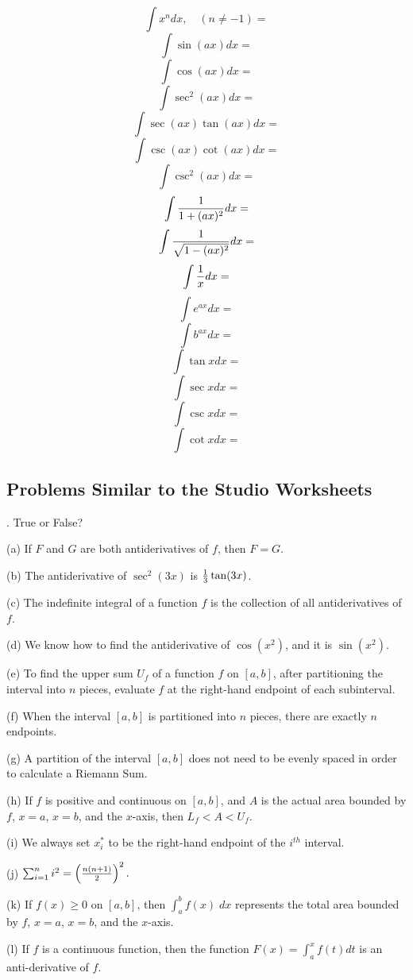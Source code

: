 \documentclass[12pt]{article}
\begin{document}
$$\int x^n dx, \quad (n \neq -1) =$$
$$\int \sin (ax) dx = $$
$$\int \cos (ax) dx = $$
$$\int \sec^2 (ax) dx = $$
$$\int \sec (ax) \tan (ax) dx = $$
$$\int \csc (ax) \cot (ax) dx = $$
$$\int \csc^2 (ax) dx = $$
$$\int {{1}\over{1+(ax)^2}} dx = $$
$$\int {{1}\over{\sqrt{1-(ax)^2}}} dx = $$
$$\int {{1}\over{x}} dx = $$
$$\int e^{ax} dx = $$
$$\int b^{ax} dx = $$
$$\int \tan x dx = $$
$$\int \sec x dx = $$
$$\int \csc x dx = $$
$$\int \cot x dx = $$
\vfil\eject

\subsection*{Problems Similar to the Studio Worksheets}

. True or False?

\noindent (a) If $F$ and $G$ are both antiderivatives of $f$, then $F=G$.

\noindent (b) The antiderivative of $\sec^2 (3x)$ is ${{1}\over{3}} \tan 
(3x)$.

\noindent (c) The indefinite integral of a function $f$ is the collection of 
all antiderivatives of $f$.

\noindent (d) We know how to find the antiderivative of $\cos(x^2)$, and it is 
$\sin (x^2)$.

\noindent (e) To find the upper sum $U_f$ of a function $f$ on $[a,b]$, 
after partitioning the interval into $n$ pieces, evaluate $f$ at the right-hand 
endpoint of each subinterval.

\noindent (f) When the interval $[a,b]$ is partitioned into $n$ pieces, there are 
exactly $n$ endpoints.

\noindent (g) A partition of the interval $[a,b]$ does not need to be evenly spaced 
in order to calculate a Riemann Sum.

\noindent (h) If $f$ is positive and continuous on $[a,b]$, and $A$ is the 
actual area bounded by $f$, $x=a$, $x=b$, and the $x$-axis, then $L_f < A < 
U_f$.

\noindent (i) We always set $x_i^*$ to be the right-hand endpoint of the $i^{th}$ 
interval.

\noindent (j) $\sum_{i=1}^{n} i^2 = \left ( {{n(n+1)}\over{2}} \right )^2.$

\noindent (k) If $f(x) \ge 0$ on $[a,b]$, then $\int_a^b f(x) \; dx$ represents the 
total area bounded by $f$, $x=a$, $x=b$, and the $x$-axis.

\noindent (l) If $f$ is a continuous function, then the function $F(x) = \int_a^x 
f(t) dt$ is an anti-derivative of $f$.
\end{document}
